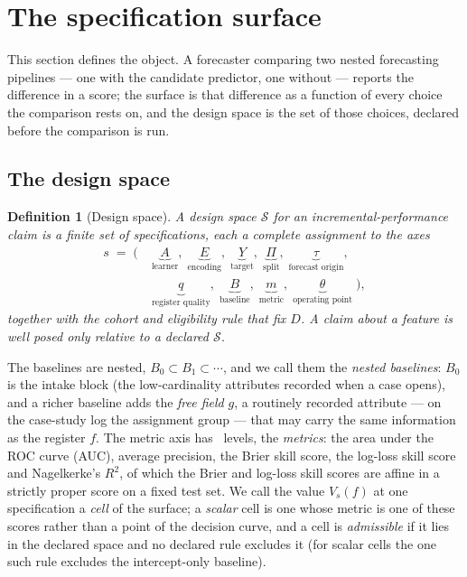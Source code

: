 \documentclass[11pt,3p,review,authoryear]{elsarticle}
\newtheorem{definition}{Definition}
\theoremstyle{definition}
\begin{document}
\section{The specification surface}
\label{sec:surface}

This section defines the object. A forecaster comparing two nested
forecasting pipelines --- one with the candidate predictor, one without ---
reports the difference in a score; the surface is that difference as a
function of every choice the comparison rests on, and the design space is
the set of those choices, declared before the comparison is run.

\subsection{The design space}

\begin{definition}[Design space]
\label{def:space}
A \emph{design space} $\mathcal{S}$ for an incremental-performance claim is a finite set
of specifications, each a complete assignment to the axes
\[
\begin{aligned}
s \;=\; \bigl(\;
&\underbrace{A}_{\text{learner}},\;
\underbrace{E}_{\text{encoding}},\;
\underbrace{Y}_{\text{target}},\;
\underbrace{\Pi}_{\text{split}},\;
\underbrace{\tau}_{\text{forecast origin}},\; \\[2pt]
&\underbrace{q}_{\text{register quality}},\;
\underbrace{B}_{\text{baseline}},\;
\underbrace{m}_{\text{metric}},\;
\underbrace{\theta}_{\text{operating point}}\;\bigr),
\end{aligned}
\]
together with the cohort and eligibility rule that fix $D$. A claim about a
feature is \emph{well posed} only relative to a declared $\mathcal{S}$.
\end{definition}

\noindent The baselines are nested, $B_0 \subset B_1 \subset \cdots$, and we
call them the \emph{nested baselines}: $B_0$ is the intake block (the
low-cardinality attributes recorded when a case opens), and a richer baseline
adds the \emph{free field} $g$, a routinely recorded attribute --- on the
case-study log the assignment group --- that may carry the same information
as the register $f$. The metric axis has \nInstruments\ levels, the
\emph{metrics}: the area under the ROC curve (AUC), average precision, the
Brier skill score, the log-loss skill score and Nagelkerke's $R^2$, of which
the Brier and log-loss skill scores are affine in a strictly proper score on
a fixed test set. We call the value
$V_s(f)$ at one specification a \emph{cell} of the surface; a \emph{scalar}
cell is one whose metric is one of these scores rather than a point of the
decision curve, and a cell is \emph{admissible} if it lies in the declared
space and no declared rule excludes it (for scalar cells the one such rule
excludes the intercept-only baseline).
\end{document}
